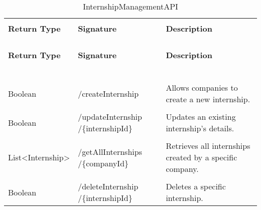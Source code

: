 \begin{longtable}{p{}p{}p{}}
    \caption{InternshipManagementAPI}
    \vspace{0.5em}\\
    \hline
    \vspace{0.5em}\\
    \textbf{Return Type} & \textbf{Signature} & \textbf{Description} \\
    \vspace{0.5em}\\
    \hline
    \vspace{0.5em}\\
    \endfirsthead
    \vspace{0.5em}\\
    \hline
    \vspace{0.5em}\\
    \textbf{Return Type} & \textbf{Signature} & \textbf{Description} \\
    \vspace{0.5em}\\
    \hline
    \vspace{0.5em}\\
    \endhead
    
    \vspace{0.5em}\\
    \hline
    \vspace{0.5em}\\
    \endfoot
    
    \vspace{0.5em}\\
    \hline
    \vspace{0.5em}\\
    \endlastfoot
    
    Boolean &
    /createInternship &
    Allows companies to create a new internship. \\
    \vspace{0.5em}\\
    Boolean &
    /updateInternship /\{internshipId\} &
    Updates an existing internship's details. \\
    \vspace{0.5em}\\
    List<Internship> &
    /getAllInternships /\{companyId\} &
    Retrieves all internships created by a specific company. \\
    \vspace{0.5em}\\
    Boolean &
    /deleteInternship /\{internshipId\} &
    Deletes a specific internship. \\

\end{longtable}


